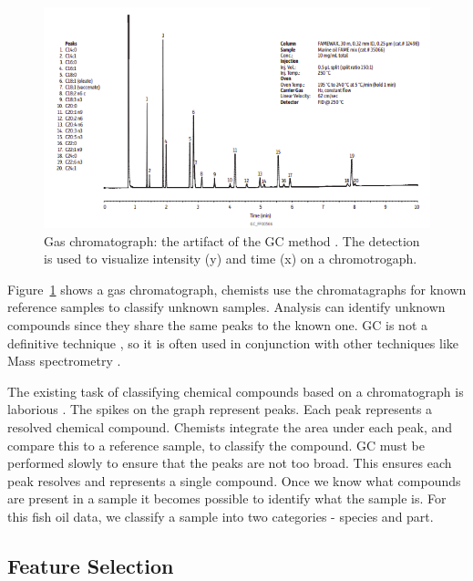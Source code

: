 \documentclass[runningheads]{llncs}
\begin{document}
\begin{figure}[htb]
  \centering
  \includegraphics[width=12.5cm]{chromatograph.png}
  \caption{
    Gas chromatograph: the artifact of the GC method \cite{restek2018high}.
    The detection is used to visualize intensity (y) and time (x) on a chromotrogaph.}
  \label{fig:gas-chromatography} 
  \captionsetup[figure]{font=small,labelfont=small}
\end{figure}

Figure~\ref{fig:gas-chromatography} shows a gas chromatograph, chemists use the chromatagraphs for known reference samples to classify unknown samples. 
Analysis can identify unknown compounds since they share the same peaks to the known one.
GC is not a definitive technique \cite{khan2013gas}, so it is often used in conjunction with other techniques like Mass spectrometry \cite{restek2018high}.

The existing task of classifying chemical compounds based on a chromatograph is laborious \cite{eder1995gas,restek2018high}.
The spikes on the graph represent peaks.
Each peak represents a resolved chemical compound.
Chemists integrate the area under each peak, and compare this to a reference sample, to classify the compound.
GC must be performed slowly to ensure that the peaks are not too broad.
This ensures each peak resolves and represents a single compound.
Once we know what compounds are present in a sample it becomes possible to identify what the sample is.
For this fish oil data, we classify a sample into two categories - species and part. 

\subsection{Feature Selection}
\label{sec:background-feature-selection}

\end{document}
